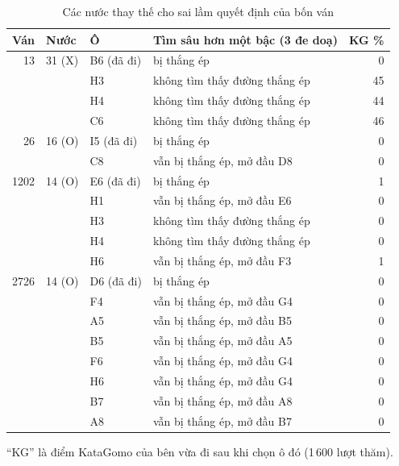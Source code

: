 \begin{table}[H]
  \centering
  \footnotesize
  \caption{Các nước thay thế cho sai lầm quyết định của bốn ván}
  \label{tab:cs-vs-thay-the}
  \begin{tabular}{rlllr}
    \toprule
    Ván & Nước & Ô & Tìm sâu hơn một bậc (3 đe doạ) & KG \% \\
    \midrule
    13 & 31 (X) & B6 (đã đi) & bị thắng ép & 0 \\
     &  & H3 & không tìm thấy đường thắng ép & 45 \\
     &  & H4 & không tìm thấy đường thắng ép & 44 \\
     &  & C6 & không tìm thấy đường thắng ép & 46 \\
    \midrule
    26 & 16 (O) & I5 (đã đi) & bị thắng ép & 0 \\
     &  & C8 & vẫn bị thắng ép, mở đầu D8 & 0 \\
    \midrule
    1202 & 14 (O) & E6 (đã đi) & bị thắng ép & 1 \\
     &  & H1 & vẫn bị thắng ép, mở đầu E6 & 0 \\
     &  & H3 & không tìm thấy đường thắng ép & 0 \\
     &  & H4 & không tìm thấy đường thắng ép & 0 \\
     &  & H6 & vẫn bị thắng ép, mở đầu F3 & 1 \\
    \midrule
    2726 & 14 (O) & D6 (đã đi) & bị thắng ép & 0 \\
     &  & F4 & vẫn bị thắng ép, mở đầu G4 & 0 \\
     &  & A5 & vẫn bị thắng ép, mở đầu B5 & 0 \\
     &  & B5 & vẫn bị thắng ép, mở đầu A5 & 0 \\
     &  & F6 & vẫn bị thắng ép, mở đầu G4 & 0 \\
     &  & H6 & vẫn bị thắng ép, mở đầu G4 & 0 \\
     &  & B7 & vẫn bị thắng ép, mở đầu A8 & 0 \\
     &  & A8 & vẫn bị thắng ép, mở đầu B7 & 0 \\
    \bottomrule
  \end{tabular}
  \par\smallskip\parbox{.95\linewidth}{\footnotesize ``KG'' là điểm KataGomo của bên vừa đi sau khi chọn ô đó (1\,600 lượt thăm).}
\end{table}
